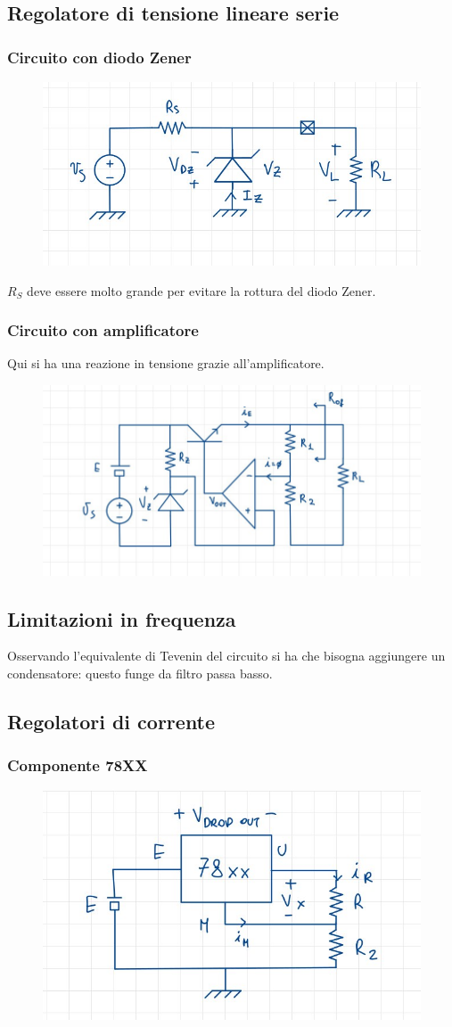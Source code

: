 \documentclass[11pt,a4paper,]{article}
\begin{document}
\subsection{Regolatore di tensione lineare serie}
\subsubsection{Circuito con diodo Zener}
\begin{figure}[H]
    \centering
    \includegraphics[width=0.5\linewidth]{img/circ ocn did zen.png}
\end{figure}
\begin{nota}
    $R_S$ deve essere molto grande per evitare la rottura del diodo Zener.
\end{nota}
\subsubsection{Circuito con amplificatore}
Qui si ha una reazione in tensione grazie all'amplificatore.
\begin{figure}[H]
    \centering
    \includegraphics[width=0.5\linewidth]{img/circ con amp reg.png}
\end{figure}
\subsection{Limitazioni in frequenza}
Osservando l'equivalente di Tevenin del circuito si ha che bisogna aggiungere un condensatore: questo funge da filtro passa basso.
\subsection{Regolatori di corrente}
\subsubsection{Componente 78XX}
\begin{figure}[H]
    \centering
    \includegraphics[width=0.25\linewidth]{img/78xx.png}
\end{figure}
\end{document}
